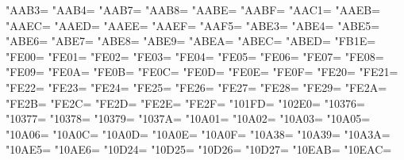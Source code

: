 \XeTeXcharclass"AAB3=\KclassCM
\XeTeXcharclass"AAB4=\KclassCM
\XeTeXcharclass"AAB7=\KclassCM
\XeTeXcharclass"AAB8=\KclassCM
\XeTeXcharclass"AABE=\KclassCM
\XeTeXcharclass"AABF=\KclassCM
\XeTeXcharclass"AAC1=\KclassCM
\XeTeXcharclass"AAEB=\KclassCM
\XeTeXcharclass"AAEC=\KclassCM
\XeTeXcharclass"AAED=\KclassCM
\XeTeXcharclass"AAEE=\KclassCM
\XeTeXcharclass"AAEF=\KclassCM
\XeTeXcharclass"AAF5=\KclassCM
\XeTeXcharclass"ABE3=\KclassCM
\XeTeXcharclass"ABE4=\KclassCM
\XeTeXcharclass"ABE5=\KclassCM
\XeTeXcharclass"ABE6=\KclassCM
\XeTeXcharclass"ABE7=\KclassCM
\XeTeXcharclass"ABE8=\KclassCM
\XeTeXcharclass"ABE9=\KclassCM
\XeTeXcharclass"ABEA=\KclassCM
\XeTeXcharclass"ABEC=\KclassCM
\XeTeXcharclass"ABED=\KclassCM
\XeTeXcharclass"FB1E=\KclassCM
\XeTeXcharclass"FE00=\KclassCM
\XeTeXcharclass"FE01=\KclassCM
\XeTeXcharclass"FE02=\KclassCM
\XeTeXcharclass"FE03=\KclassCM
\XeTeXcharclass"FE04=\KclassCM
\XeTeXcharclass"FE05=\KclassCM
\XeTeXcharclass"FE06=\KclassCM
\XeTeXcharclass"FE07=\KclassCM
\XeTeXcharclass"FE08=\KclassCM
\XeTeXcharclass"FE09=\KclassCM
\XeTeXcharclass"FE0A=\KclassCM
\XeTeXcharclass"FE0B=\KclassCM
\XeTeXcharclass"FE0C=\KclassCM
\XeTeXcharclass"FE0D=\KclassCM
\XeTeXcharclass"FE0E=\KclassCM
\XeTeXcharclass"FE0F=\KclassCM
\XeTeXcharclass"FE20=\KclassCM
\XeTeXcharclass"FE21=\KclassCM
\XeTeXcharclass"FE22=\KclassCM
\XeTeXcharclass"FE23=\KclassCM
\XeTeXcharclass"FE24=\KclassCM
\XeTeXcharclass"FE25=\KclassCM
\XeTeXcharclass"FE26=\KclassCM
\XeTeXcharclass"FE27=\KclassCM
\XeTeXcharclass"FE28=\KclassCM
\XeTeXcharclass"FE29=\KclassCM
\XeTeXcharclass"FE2A=\KclassCM
\XeTeXcharclass"FE2B=\KclassCM
\XeTeXcharclass"FE2C=\KclassCM
\XeTeXcharclass"FE2D=\KclassCM
\XeTeXcharclass"FE2E=\KclassCM
\XeTeXcharclass"FE2F=\KclassCM
\XeTeXcharclass"101FD=\KclassCM
\XeTeXcharclass"102E0=\KclassCM
\XeTeXcharclass"10376=\KclassCM
\XeTeXcharclass"10377=\KclassCM
\XeTeXcharclass"10378=\KclassCM
\XeTeXcharclass"10379=\KclassCM
\XeTeXcharclass"1037A=\KclassCM
\XeTeXcharclass"10A01=\KclassCM
\XeTeXcharclass"10A02=\KclassCM
\XeTeXcharclass"10A03=\KclassCM
\XeTeXcharclass"10A05=\KclassCM
\XeTeXcharclass"10A06=\KclassCM
\XeTeXcharclass"10A0C=\KclassCM
\XeTeXcharclass"10A0D=\KclassCM
\XeTeXcharclass"10A0E=\KclassCM
\XeTeXcharclass"10A0F=\KclassCM
\XeTeXcharclass"10A38=\KclassCM
\XeTeXcharclass"10A39=\KclassCM
\XeTeXcharclass"10A3A=\KclassCM
\XeTeXcharclass"10AE5=\KclassCM
\XeTeXcharclass"10AE6=\KclassCM
\XeTeXcharclass"10D24=\KclassCM
\XeTeXcharclass"10D25=\KclassCM
\XeTeXcharclass"10D26=\KclassCM
\XeTeXcharclass"10D27=\KclassCM
\XeTeXcharclass"10EAB=\KclassCM
\XeTeXcharclass"10EAC=\KclassCM

